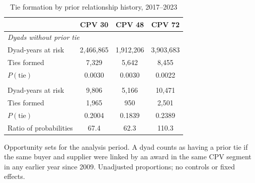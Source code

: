 \begin{table}[htbp]
\centering
\begin{threeparttable}
\caption{Tie formation by prior relationship history, 2017--2023}
\label{tab:crosstab}
\begin{tabular}{lccc}
\toprule
 & CPV 30 & CPV 48 & CPV 72 \\
\midrule
\multicolumn{4}{l}{\textit{Dyads without prior tie}} \\
\quad Dyad-years at risk & 2,466,865 & 1,912,206 & 3,903,683 \\
\quad Ties formed & 7,329 & 5,642 & 8,455 \\
\quad $P(\text{tie})$ & 0.0030 & 0.0030 & 0.0022 \\
\addlinespace
\multicolumn{4}{l}{\textit{Dyads with prior tie}} \\
\quad Dyad-years at risk & 9,806 & 5,166 & 10,471 \\
\quad Ties formed & 1,965 & 950 & 2,501 \\
\quad $P(\text{tie})$ & 0.2004 & 0.1839 & 0.2389 \\
\midrule
Ratio of probabilities & 67.4 & 62.3 & 110.3 \\
\bottomrule
\end{tabular}
\begin{tablenotes}\small\item Opportunity sets for the analysis period. A dyad counts as having a prior tie if the same buyer and supplier were linked by an award in the same CPV segment in any earlier year since 2009. Unadjusted proportions; no controls or fixed effects.\end{tablenotes}
\end{threeparttable}
\end{table}